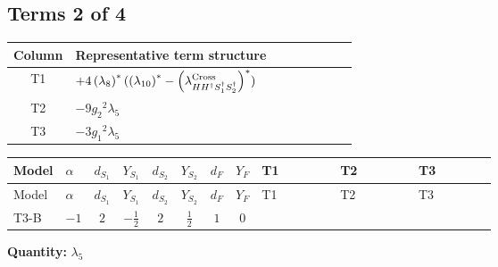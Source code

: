 \documentclass[8pt]{article}
\begin{document}
\begin{landscape}
\subsection*{Terms 2 of 4}
\begin{center}
\begin{tabular}{@{}c >{\raggedright\arraybackslash}p{0.82\linewidth}@{}}
\toprule
Column & Representative term structure \\
\midrule
T1 & \(\displaystyle +4 \left({\lambda_{8}}\right)^{*} (\left({\lambda_{10}}\right)^{*}-\left({\lambda_{H H^\dagger S_1^\dagger S_2^\dagger}^{\rm Cross}}\right)^{*})\) \\
\midrule
T2 & \(\displaystyle -9 {g_2}^2 {\lambda_5}\) \\
\midrule
T3 & \(\displaystyle -3 {g_1}^2 {\lambda_5}\) \\
\midrule
\bottomrule
\end{tabular}
\end{center}
\smallskip
\tiny
\begin{longtable}{@{}llcccccc >{\raggedright\arraybackslash}p{0.21\linewidth} >{\raggedright\arraybackslash}p{0.21\linewidth} >{\raggedright\arraybackslash}p{0.21\linewidth}@{}}
\toprule
Model & $\alpha$ & $d_{S_1}$ & $Y_{S_1}$ & $d_{S_2}$ & $Y_{S_2}$ & $d_F$ & $Y_F$ & T1 & T2 & T3 \\
\midrule
\endfirsthead
\toprule
Model & $\alpha$ & $d_{S_1}$ & $Y_{S_1}$ & $d_{S_2}$ & $Y_{S_2}$ & $d_F$ & $Y_F$ & T1 & T2 & T3 \\
\midrule
\endhead
T3-B & $-1$ & $2$ & $-\frac{1}{2}$ & $2$ & $\frac{1}{2}$ & $1$ & $0$ & \scriptsize\adjustbox{max width=\linewidth}{$\begin{gathered} +4 \left({\lambda_{8}}\right)^{*} (\left({\lambda_{10}}\right)^{*}-\left({\lambda_{H H^\dagger S_1^\dagger S_2^\dagger}^{\rm Cross}}\right)^{*})\end{gathered}$} & \scriptsize\adjustbox{max width=\linewidth}{$\begin{gathered} -9 {g_2}^2 {\lambda_5}\end{gathered}$} & \scriptsize\adjustbox{max width=\linewidth}{$\begin{gathered} -3 {g_1}^2 {\lambda_5}\end{gathered}$} \\
\midrule
\bottomrule
\end{longtable}
\clearpage
\noindent\textbf{Quantity: }$\lambda_5$\par\smallskip

\end{landscape}
\end{document}
